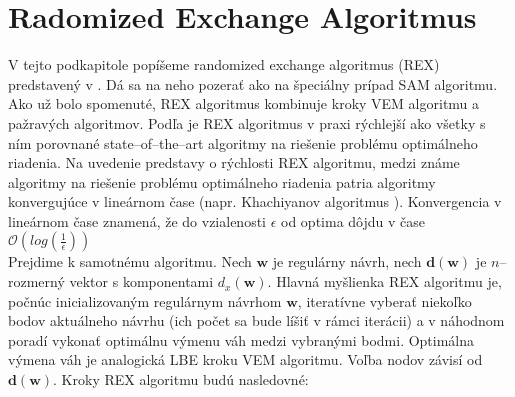 \section {Radomized Exchange Algoritmus}

V tejto podkapitole popíšeme randomized exchange algoritmus (REX) predstavený v \cite{rex_harman}. Dá sa na neho pozerať ako na špeciálny prípad SAM algoritmu. Ako už bolo spomenuté, REX algoritmus kombinuje kroky VEM algoritmu a pažravých algoritmov. Podľa \cite{rex_harman} je REX algoritmus v praxi rýchlejší ako všetky s ním porovnané state--of--the--art algoritmy na riešenie problému optimálneho riadenia. Na uvedenie predstavy o rýchlosti REX algoritmu, medzi známe algoritmy na riešenie problému optimálneho riadenia patria algoritmy konvergujúce v lineárnom čase (napr. Khachiyanov algoritmus \cite{complexity_khachiyan}). Konvergencia v lineárnom čase znamená, že do vzialenosti $\epsilon$ od optima dôjdu v čase $\mathcal{O}(log(\frac{1}{\epsilon}))$ \\

Prejdime k samotnému algoritmu. Nech $\mathbf w$ je regulárny návrh, nech $\mathbf {d(w)}$ je $n$--rozmerný vektor s komponentami $d_x(\mathbf w)$. Hlavná myšlienka REX algoritmu je, počnúc inicializovaným regulárnym návrhom $\mathbf w$, iteratívne vyberať niekoľko bodov aktuálneho návrhu (ich počet sa bude líšiť v rámci iterácii) a v náhodnom poradí vykonať optimálnu výmenu váh medzi vybranými bodmi. Optimálna výmena váh je analogická LBE kroku VEM algoritmu. Voľba nodov závisí od $\mathbf{d(w)}$. Kroky REX algoritmu budú nasledovné:

